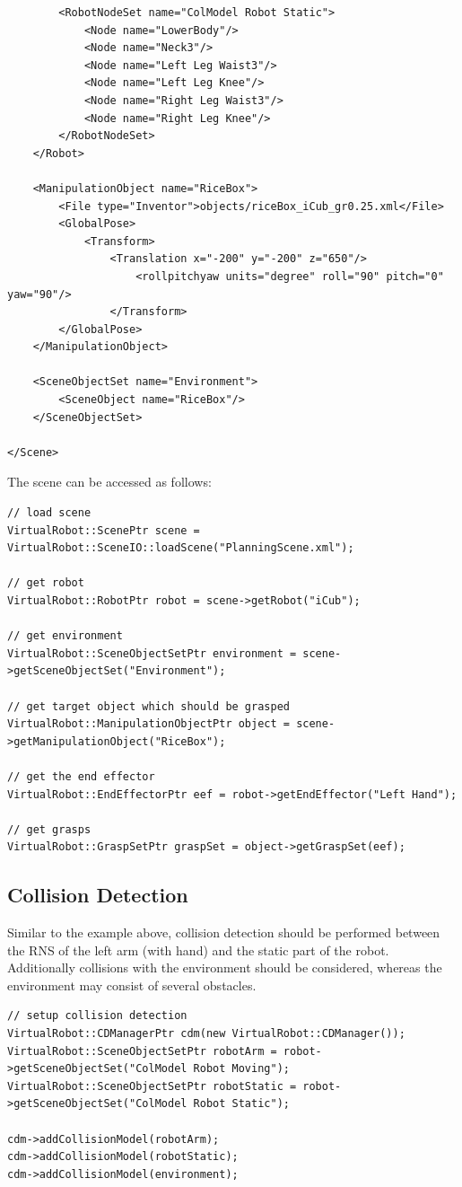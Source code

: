 \documentclass{book}
\begin{document}
\begin{lstlisting}
        <RobotNodeSet name="ColModel Robot Static">
            <Node name="LowerBody"/>
            <Node name="Neck3"/>
            <Node name="Left Leg Waist3"/>
            <Node name="Left Leg Knee"/>
            <Node name="Right Leg Waist3"/>
            <Node name="Right Leg Knee"/>
        </RobotNodeSet>
    </Robot>

    <ManipulationObject name="RiceBox">
        <File type="Inventor">objects/riceBox_iCub_gr0.25.xml</File>
        <GlobalPose>
            <Transform>
                <Translation x="-200" y="-200" z="650"/>
                    <rollpitchyaw units="degree" roll="90" pitch="0" yaw="90"/>
                </Transform>
        </GlobalPose>
    </ManipulationObject>

    <SceneObjectSet name="Environment">
        <SceneObject name="RiceBox"/>
    </SceneObjectSet>

</Scene>
\end{lstlisting}
The scene can be accessed as follows: 
\begin{lstlisting}
// load scene
VirtualRobot::ScenePtr scene = VirtualRobot::SceneIO::loadScene("PlanningScene.xml");

// get robot
VirtualRobot::RobotPtr robot = scene->getRobot("iCub");

// get environment
VirtualRobot::SceneObjectSetPtr environment = scene->getSceneObjectSet("Environment");

// get target object which should be grasped
VirtualRobot::ManipulationObjectPtr object = scene->getManipulationObject("RiceBox");

// get the end effector
VirtualRobot::EndEffectorPtr eef = robot->getEndEffector("Left Hand");

// get grasps
VirtualRobot::GraspSetPtr graspSet = object->getGraspSet(eef);
\end{lstlisting}
\subsection{Collision Detection}
Similar to the example above, collision detection should be performed between the RNS of the left arm (with hand) and the static part of the robot. Additionally collisions with the environment should be considered, whereas the environment may consist of several obstacles. 
\begin{lstlisting}
// setup collision detection
VirtualRobot::CDManagerPtr cdm(new VirtualRobot::CDManager());
VirtualRobot::SceneObjectSetPtr robotArm = robot->getSceneObjectSet("ColModel Robot Moving");
VirtualRobot::SceneObjectSetPtr robotStatic = robot->getSceneObjectSet("ColModel Robot Static");

cdm->addCollisionModel(robotArm);
cdm->addCollisionModel(robotStatic);
cdm->addCollisionModel(environment);
\end{lstlisting}
\end{document}
